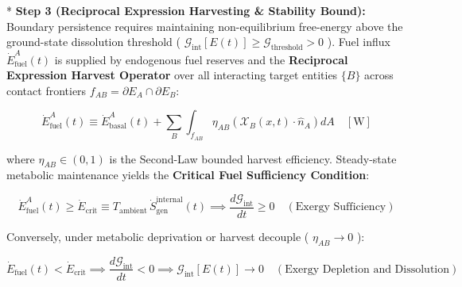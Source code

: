 \documentclass[11pt,a4paper]{article}
\theoremstyle{definition}\newtheorem{definition}{Definition}
\theoremstyle{remark}\newtheorem{remark}{Remark}
\begin{document}
* \textbf{Step 3 (Reciprocal Expression Harvesting \& Stability Bound):}
Boundary persistence requires maintaining non-equilibrium free-energy above the ground-state dissolution threshold ( $\mathcal{G}_{\text{int}}[E(t)] \ge \mathcal{G}_{\text{threshold}} > 0$ ). Fuel influx $\dot{E}_{\text{fuel}}^A(t)$ is supplied by endogenous fuel reserves and the \textbf{Reciprocal Expression Harvest Operator} over all interacting target entities $\{B\}$ across contact frontiers $f_{AB} = \partial E_A \cap \partial E_B$:


\begin{equation}
\boxed{\dot{E}_{\text{fuel}}^A(t) \equiv \dot{E}_{\text{basal}}^A(t) + \sum_{B} \int_{f_{AB}} \eta_{AB} \left( \boldsymbol{\mathcal{X}}_B(x, t) \cdot \hat{n}_A \right) dA \quad [\mathrm{W}]}
\end{equation}


where $\eta_{AB} \in (0, 1)$ is the Second-Law bounded harvest efficiency. Steady-state metabolic maintenance yields the \textbf{Critical Fuel Sufficiency Condition}:


\begin{equation}
\boxed{\dot{E}_{\text{fuel}}^A(t) \ge \dot{E}_{\text{crit}} \equiv T_{\text{ambient}} \, \dot{S}_{\text{gen}}^{\text{internal}}(t) \implies \frac{d\mathcal{G}_{\text{int}}}{dt} \ge 0 \quad (\text{Exergy Sufficiency})}
\end{equation}


Conversely, under metabolic deprivation or harvest decouple ( $\eta_{AB} \to 0$ ):


\begin{equation}
\boxed{\dot{E}_{\text{fuel}}(t) < \dot{E}_{\text{crit}} \implies \frac{d\mathcal{G}_{\text{int}}}{dt} < 0 \implies \mathcal{G}_{\text{int}}[E(t)] \longrightarrow 0 \quad (\text{Exergy Depletion and Dissolution})}
\end{equation}
\end{document}
